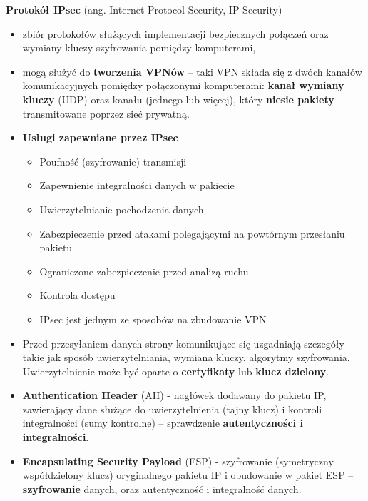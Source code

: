 \documentclass[main.tex]{subfiles}
\begin{document}
    \noindent \textbf{Protokół IPsec} (ang. Internet Protocol Security, IP Security)
    \begin{itemize}[noitemsep]
        \item zbiór protokołów służących implementacji bezpiecznych połączeń oraz wymiany kluczy szyfrowania pomiędzy
        komputerami,
        \item mogą służyć do \textbf{tworzenia VPNów} -- taki VPN składa się z dwóch kanałów komunikacyjnych pomiędzy
        połączonymi komputerami: \textbf{kanał wymiany kluczy} (UDP) oraz kanału (jednego lub więcej), który \textbf{niesie
        pakiety} transmitowane poprzez sieć prywatną.
        \item \textbf{Usługi zapewniane przez IPsec}
        \begin{itemize}[noitemsep]
            \item Poufność (szyfrowanie) transmisji
            \item Zapewnienie integralności danych w pakiecie
            \item Uwierzytelnianie pochodzenia danych
            \item Zabezpieczenie przed atakami polegającymi na powtórnym przesłaniu pakietu
            \item Ograniczone zabezpieczenie przed analizą ruchu
            \item Kontrola dostępu
            \item IPsec jest jednym ze sposobów na zbudowanie VPN
        \end{itemize}

        \item Przed przesyłaniem danych strony komunikujące się uzgadniają szczegóły takie jak sposób uwierzytelniania,
        wymiana kluczy, algorytmy szyfrowania. Uwierzytelnienie może być oparte o \textbf{certyfikaty} lub
        \textbf{klucz dzielony}.

        \item \textbf{Authentication Header} (AH) - nagłówek dodawany do pakietu IP, zawierający dane służące do
        uwierzytelnienia (tajny klucz) i kontroli integralności (sumy kontrolne) -- sprawdzenie \textbf{autentyczności
        i integralności}.

        \item \textbf{Encapsulating Security Payload} (ESP) - szyfrowanie (symetryczny współdzielony klucz)
        oryginalnego pakietu IP i obudowanie w pakiet ESP -- \textbf{szyfrowanie} danych, oraz autentyczność i
        integralność danych.


\end{itemize}
\end{document}
